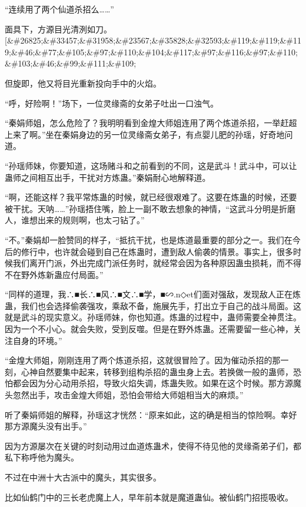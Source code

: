 
\begin{this_body}

“连续用了两个仙道杀招么……”

面具下，方源目光清洌如刀。[\&\#26825;\&\#33457;\&\#31958;\&\#23567;\&\#35828;\&\#32593;\&\#119;\&\#119;\&\#119;\&\#46;\&\#77;\&\#105;\&\#97;\&\#110;\&\#104;\&\#117;\&\#97;\&\#116;\&\#97;\&\#110;\&\#103;\&\#46;\&\#99;\&\#111;\&\#109;

但旋即，他又将目光重新投向手中的火焰。

“呼，好险啊！”场下，一位灵缘斋的女弟子吐出一口浊气。

“秦娟师姐，怎么危险了？我明明看到金煌大师姐连用了两个炼道杀招，一举赶超上来了啊。”坐在秦娟身边的另一位灵缘斋女弟子，有点婴儿肥的孙瑶，好奇地问道。

“孙瑶师妹，你要知道，这场赌斗和之前看到的不同，这是武斗！武斗中，可以让蛊师之间相互出手，干扰对方炼蛊。”秦娟耐心地解释道。

“啊，还能这样？我平常炼蛊的时候，就已经很艰难了。这要在炼蛊的时候，还要被干扰。天呐……”孙瑶捂住嘴，脸上一副不敢去想象的神情，“这武斗分明是折磨人，谁想出来的规则啊，也太刁钻了。”

“不。”秦娟却一脸赞同的样子，“抵抗干扰，也是炼道最重要的部分之一。我们在今后的修行中，也许就会碰到自己在炼蛊时，遭到敌人偷袭的情景。事实上，很多时候我们离开门派，外出完成门派任务时，就经常会因为各种原因蛊虫损耗，而不得不在野外炼新蛊应付局面。”

“同样的道理，我∴■长∴■风∴■文∴■学，■∽.n◇et们面对强敌，发现敌人正在炼蛊，我们也会选择偷袭强攻，乘敌不备，施展先手，打出立于自己的战斗局面。这就是武斗的现实意义。孙瑶师妹，你也知道。炼蛊的过程中，蛊师需要全神贯注。因为一个不小心。就会失败，受到反噬。但是在野外炼蛊。还需要留一些心神，关注自身的环境。”

“金煌大师姐，刚刚连用了两个炼道杀招，这就很冒险了。因为催动杀招的那一刻，心神自然要集中起来，转移到组构杀招的蛊虫身上去。若换做一般的蛊师，恐怕都会因为分心动用杀招，导致火焰失调，炼蛊失败。如果在这个时候。那方源魔头忽然出手，攻击金煌大师姐，恐怕会带给大师姐相当大的麻烦。”

听了秦娟师姐的解释，孙瑶这才恍然：“原来如此，这的确是相当的惊险啊。幸好那方源魔头没有出手。”

因为方源屡次在关键的时刻动用过血道炼蛊术，使得不待见他的灵缘斋弟子们，都私下称呼他为魔头。

不过在中洲十大古派中的魔头，其实很多。

比如仙鹤门中的三长老虎魔上人，早年前本就是魔道蛊仙。被仙鹤门招揽吸收。


\end{this_body}
